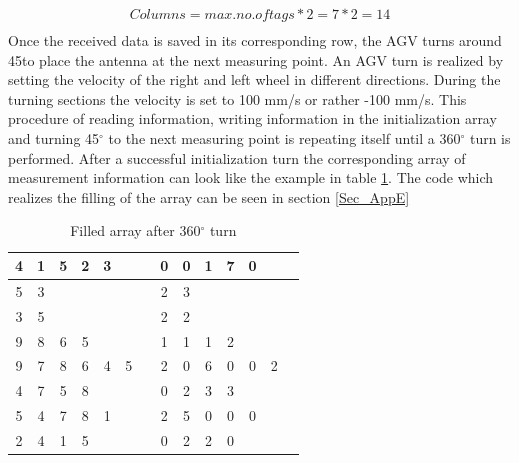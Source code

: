 \begin{align}
Columns = max. no. of  tags * 2 = 7 * 2 = 14\\
\end{align}
Once the received data is saved in its corresponding row, the AGV turns around 45\textdegree  to place the antenna at the next measuring point. An AGV turn is realized by setting the velocity of the right and left wheel in different directions. During the turning sections the velocity is set to 100 mm/s or rather -100 mm/s. 
This procedure of reading information, writing information in the initialization array and turning 45$^\circ$  to the next measuring point is repeating itself until a 360$^\circ$  turn is performed. After a successful initialization turn the corresponding array of measurement information can look like the example in table \ref{Init_Array}. The code which realizes the filling of the array can be seen in section \ref{Sec_AppE}
\begin{table}[!htbp]
\centering
\begin{tabular}{|c|c|c|c|c|c|c|c|c|c|c|c|c|c|}
\hline
4&1&5&2&3&&&0&0&1&7&0&&  \\ \hline
5&3&&&&&&2&3&&&&&  \\ \hline
3&5&&&&&&2&2&&&&&  \\ \hline
9&8&6&5&&&&1&1&1&2&&&  \\ \hline
9&7&8&6&4&5&&2&0&6&0&0&2&  \\ \hline
4&7&5&8&&&&0&2&3&3&&&  \\ \hline
5&4&7&8&1&&&2&5&0&0&0&&  \\ \hline
2&4&1&5&&&&0&2&2&0&&&  \\ \hline
\end{tabular}
\caption{Filled array after 360$^\circ$ turn}
\label{Init_Array}
\end{table}\\

